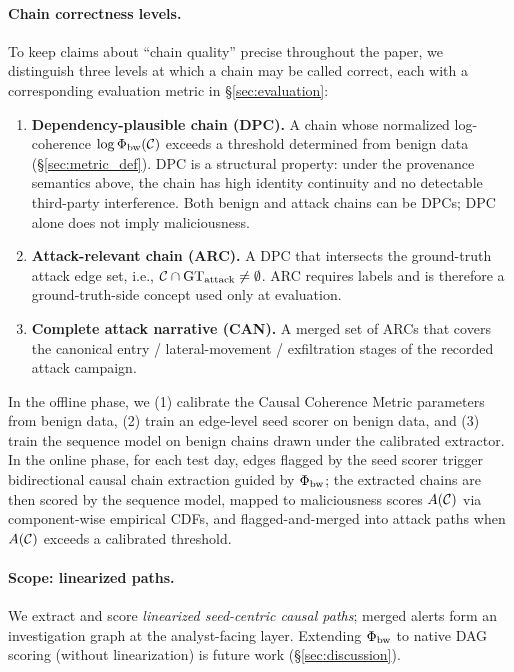 \paragraph{Chain correctness levels.} To keep claims about ``chain quality'' precise throughout the paper, we distinguish three levels at which a chain may be called correct, each with a corresponding evaluation metric in \S\ref{sec:evaluation}:

\begin{enumerate}
\item \textbf{Dependency-plausible chain (DPC).} A chain whose normalized log-coherence $\log \Phi_{\text{bw}}(\mathcal{C})$ exceeds a threshold determined from benign data (\S\ref{sec:metric_def}). DPC is a structural property: under the provenance semantics above, the chain has high identity continuity and no detectable third-party interference. Both benign and attack chains can be DPCs; DPC alone does not imply maliciousness.
\item \textbf{Attack-relevant chain (ARC).} A DPC that intersects the ground-truth attack edge set, i.e., $\mathcal{C} \cap \mathrm{GT}_{\text{attack}} \neq \emptyset$. ARC requires labels and is therefore a ground-truth-side concept used only at evaluation.
\item \textbf{Complete attack narrative (CAN).} A merged set of ARCs that covers the canonical entry / lateral-movement / exfiltration stages of the recorded attack campaign.
\end{enumerate}

In the offline phase, we (1) calibrate the Causal Coherence Metric parameters from benign data, (2) train an edge-level seed scorer on benign data, and (3) train the sequence model on benign chains drawn under the calibrated extractor. In the online phase, for each test day, edges flagged by the seed scorer trigger bidirectional causal chain extraction guided by $\Phi_{\text{bw}}$; the extracted chains are then scored by the sequence model, mapped to maliciousness scores $A(\mathcal{C})$ via component-wise empirical CDFs, and flagged-and-merged into attack paths when $A(\mathcal{C})$ exceeds a calibrated threshold.

\paragraph{Scope: linearized paths.} We extract and score \emph{linearized seed-centric causal paths}; merged alerts form an investigation graph at the analyst-facing layer. Extending $\Phi_{\text{bw}}$ to native DAG scoring (without linearization) is future work (\S\ref{sec:discussion}).

